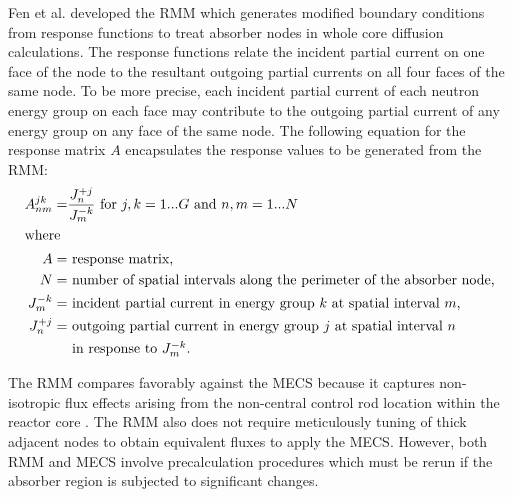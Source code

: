 Fen et al. \cite{fen_modelling_1992} developed the \gls{RMM} which generates modified boundary
conditions from response functions to treat absorber nodes in whole core diffusion calculations.
The response functions relate the incident partial current on one face of the node to the resultant
outgoing partial currents on all four faces of the same node. To be more precise, each incident
partial current of each neutron energy group on each face may contribute to the outgoing partial
current of any energy group on any face of the same node. The following equation for the response
matrix $A$ encapsulates the response values to be generated from the \gls{RMM}:
%
\begin{align}
  A^{jk}_{nm} =& \frac{J^{+j}_n}{J^{-k}_m} \mbox{ for } j,k=1...G \mbox{ and } n,m=1...N
  \label{eq:rmm} \\
  \shortintertext{where}
  A =& \mbox{ response matrix,} \nonumber \\
  N =& \mbox{ number of spatial intervals along the perimeter of the absorber node,} \nonumber \\
  J^{-k}_m =& \mbox{ incident partial current in energy group $k$ at spatial interval $m$,}
    \nonumber \\
  J^{+j}_n =& \mbox{ outgoing partial current in energy group $j$ at spatial interval $n$}
    \nonumber \\
  &\mbox{ in response to $J^{-k}_m$.} \nonumber
\end{align}

The \gls{RMM} compares favorably against the \gls{MECS} because it captures non-isotropic flux
effects arising from the non-central control rod location within the reactor core
\cite{fen_modelling_1992}. The \gls{RMM} also does not require
meticulously tuning of thick adjacent nodes to obtain equivalent fluxes to apply the \gls{MECS}.
However, both \gls{RMM} and \gls{MECS} involve precalculation procedures which must be rerun if the
absorber region is subjected to significant changes.

